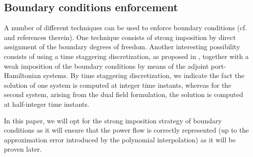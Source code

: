 \documentclass{elsarticle}
\begin{document}
\subsection{Boundary conditions enforcement}\label{subsection:weak_bcs}
A number of different techniques can be used to enforce boundary conditions (cf. \cite{benner2015timebc} and references therein). One technique consists of strong imposition by direct assignment of the boundary degrees of freedom.
Another interesting possibility consists of using a time staggering discretization, as proposed in \cite{zhang2021mass}, together with a weak imposition of the boundary conditions by means of the adjoint port-Hamiltonian systems. By time staggering discretization, we indicate the fact the solution of one system is computed at integer time instants, whereas for the second system, arising from the dual field formulation, the solution is computed at half-integer time instants.

In this paper, we will opt for the strong imposition strategy of boundary conditions as it will ensure that the power flow is correctly represented (up to the approximation error introduced by the polynomial interpolation) as it will be proven later.
\end{document}
